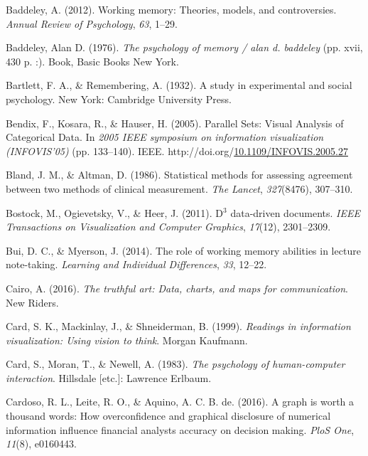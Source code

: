 \documentclass[print]{nuthesis}
\newlength{\cslhangindent}
\newenvironment{CSLReferences}[2]%
{\setlength{\parindent}{0pt}%
\everypar{\setlength{\hangindent}{\cslhangindent}}\ignorespaces}%
{\par}
\begin{document}
\begin{CSLReferences}{1}{0}
\leavevmode{}%
Baddeley, A. (2012). Working memory: Theories, models, and controversies. \emph{Annual Review of Psychology}, \emph{63}, 1--29.

\leavevmode{}%
Baddeley, Alan D. (1976). \emph{The psychology of memory / alan d. baddeley} (pp. xvii, 430 p. :). Book, Basic Books New York.

\leavevmode{}%
Bartlett, F. A., \& Remembering, A. (1932). A study in experimental and social psychology. New York: Cambridge University Press.

\leavevmode{}%
Bendix, F., Kosara, R., \& Hauser, H. (2005). {Parallel Sets: Visual Analysis of Categorical Data}. In \emph{2005 IEEE symposium on information visualization (INFOVIS'05)} (pp. 133--140). IEEE. http://doi.org/\href{https://doi.org/10.1109/INFOVIS.2005.27}{10.1109/INFOVIS.2005.27}

\leavevmode{}%
Bland, J. M., \& Altman, D. (1986). Statistical methods for assessing agreement between two methods of clinical measurement. \emph{The Lancet}, \emph{327}(8476), 307--310.

\leavevmode{}%
Bostock, M., Ogievetsky, V., \& Heer, J. (2011). D\(^3\) data-driven documents. \emph{IEEE Transactions on Visualization and Computer Graphics}, \emph{17}(12), 2301--2309.

\leavevmode{}%
Bui, D. C., \& Myerson, J. (2014). The role of working memory abilities in lecture note-taking. \emph{Learning and Individual Differences}, \emph{33}, 12--22.

\leavevmode{}%
Cairo, A. (2016). \emph{The truthful art: Data, charts, and maps for communication}. New Riders.

\leavevmode{}%
Card, S. K., Mackinlay, J., \& Shneiderman, B. (1999). \emph{Readings in information visualization: Using vision to think}. Morgan Kaufmann.

\leavevmode{}%
Card, S., Moran, T., \& Newell, A. (1983). \emph{The psychology of human-computer interaction}. Hillsdale {[}etc.{]}: Lawrence Erlbaum.

\leavevmode{}%
Cardoso, R. L., Leite, R. O., \& Aquino, A. C. B. de. (2016). A graph is worth a thousand words: How overconfidence and graphical disclosure of numerical information influence financial analysts accuracy on decision making. \emph{PloS One}, \emph{11}(8), e0160443.


\end{CSLReferences}
\end{document}

